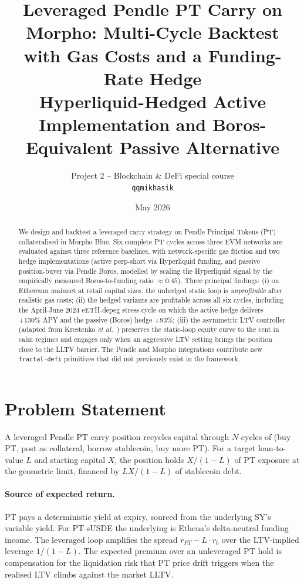 \documentclass[11pt,a4paper]{article}
\title{%
  Leveraged Pendle PT Carry on Morpho: Multi-Cycle Backtest with Gas
  Costs and a Funding-Rate Hedge\\[2pt]
  \large Hyperliquid-Hedged Active Implementation and Boros-Equivalent
  Passive Alternative}
\author{%
  Project 2 -- Blockchain \& DeFi special course\\
  \texttt{qqmikhasik}}
\date{May 2026}
\begin{document}
\maketitle

\begin{abstract}
We design and backtest a leveraged carry strategy on Pendle Principal
Tokens (PT) collateralised in Morpho Blue. Six complete PT cycles
across three EVM networks are evaluated against three reference
baselines, with network-specific gas friction and two hedge
implementations (active perp-short via Hyperliquid funding, and
passive position-buyer via Pendle Boros, modelled by scaling the
Hyperliquid signal by the empirically measured Boros-to-funding
ratio \(\approx 0.45\)). Three principal findings: (i) on Ethereum
mainnet at retail capital sizes, the unhedged static loop is
\emph{unprofitable} after realistic gas costs; (ii) the hedged
variants are profitable across all six cycles, including the
April-June 2024 eETH-depeg stress cycle on which the active hedge
delivers \(+130\%\) APY and the passive (Boros) hedge \(+93\%\);
(iii) the asymmetric LTV controller (adapted from Krestenko
\emph{et al.}~\cite{krestenko2026}) preserves the static-loop
equity curve to the cent in calm regimes and engages only when an
aggressive LTV setting brings the position close to the LLTV
barrier. The Pendle and Morpho integrations contribute new
\texttt{fractal-defi} primitives that did not previously exist in
the framework.
\end{abstract}

\section{Problem Statement}
\label{sec:problem}

A leveraged Pendle PT carry position recycles capital through
\(N\) cycles of (buy PT, post as collateral, borrow stablecoin,
buy more PT). For a target loan-to-value \(L\) and starting
capital \(X\), the position holds \(X / (1-L)\) of PT exposure at
the geometric limit, financed by \(LX / (1-L)\) of stablecoin debt.

\paragraph{Source of expected return.} PT pays a deterministic
yield at expiry, sourced from the underlying SY's variable yield.
For PT-sUSDE the underlying is Ethena's delta-neutral funding
income. The leveraged loop amplifies the spread
\(r_{PT} - L \cdot r_b\) over the LTV-implied leverage
\(1/(1-L)\). The expected premium over an unleveraged PT hold is
compensation for the liquidation risk that PT price drift triggers
when the realised LTV climbs against the market LLTV.
\end{document}
